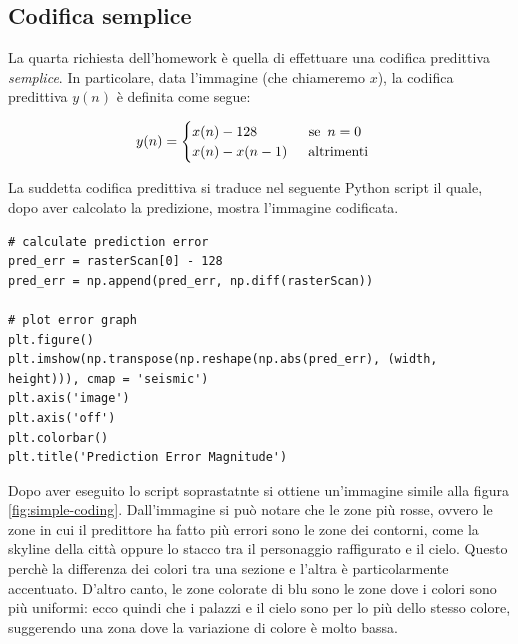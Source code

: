 \vspace{15px}\subsection{Codifica semplice}\label{simple-coding}
La quarta richiesta dell'homework è quella di effettuare una codifica predittiva \textsl{semplice}. In particolare, data l'immagine (che chiameremo $x$), la codifica predittiva $y(n)$ è definita come segue:

\begin{gather*}
    y(n) = 
    \begin{cases}
        x(n) - 128 \hspace{37px} \text{se } \, n = 0 \\
        x(n) - x(n - 1) \hspace{15px} \text{altrimenti}\\
    \end{cases}
\end{gather*}

\noindent La suddetta codifica predittiva si traduce nel seguente Python script il quale, dopo aver calcolato la predizione, mostra l'immagine codificata.

\begin{lstlisting}
# calculate prediction error
pred_err = rasterScan[0] - 128
pred_err = np.append(pred_err, np.diff(rasterScan))

# plot error graph
plt.figure()
plt.imshow(np.transpose(np.reshape(np.abs(pred_err), (width, height))), cmap = 'seismic')
plt.axis('image')
plt.axis('off')
plt.colorbar()
plt.title('Prediction Error Magnitude')
\end{lstlisting}

\noindent Dopo aver eseguito lo script soprastatnte si ottiene un'immagine simile alla figura \ref{fig:simple-coding}. Dall'immagine si può notare che le zone più rosse, ovvero le zone in cui il predittore ha fatto più errori sono le zone dei contorni, come la skyline della città oppure lo stacco tra il personaggio raffigurato e il cielo. Questo perchè la differenza dei colori tra una sezione e l'altra è particolarmente accentuato. D'altro canto, le zone colorate di blu sono le zone dove i colori sono più uniformi: ecco quindi che i palazzi e il cielo sono per lo più dello stesso colore, suggerendo una zona dove la variazione di colore è molto bassa.

